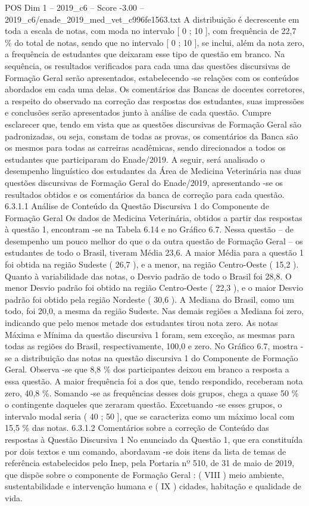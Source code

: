 \begin{textsample}{POS Dim 1 – 2019\_c6 – Score -3.00 – 2019\_c6/enade\_2019\_med\_vet\_c996fe1563.txt}
A distribuição é decrescente em toda a escala de notas, com moda no intervalo [ 0 ; 10 ], com frequência de 22,7 \% do total de notas, sendo que no intervalo [ 0 ; 10 ], se inclui, além da nota zero, a frequência de estudantes que deixaram esse tipo de questão em branco.
Na sequência, os resultados verificados para cada uma das questões discursivas de Formação Geral serão apresentados, estabelecendo -se relações com os conteúdos abordados em cada uma delas.
Os comentários das Bancas de docentes corretores, a respeito do observado na correção das respostas dos estudantes, suas impressões e conclusões serão apresentados junto à análise de cada questão.
Cumpre esclarecer que, tendo em vista que as questões discursivas de Formação Geral são padronizadas, ou seja, constam de todas as provas, os comentários da Banca são os mesmos para todas as carreiras acadêmicas, sendo direcionados a todos os estudantes que participaram do Enade/2019.
A seguir, será analisado o desempenho linguístico dos estudantes da Área de Medicina Veterinária nas duas questões discursivas de Formação Geral do Enade/2019, apresentando -se os resultados obtidos e os comentários da banca de correção para cada questão. 6.3.1.1 Análise de Conteúdo da Questão Discursiva 1 do Componente de Formação Geral Os dados de Medicina Veterinária, obtidos a partir das respostas à questão 1, encontram -se na Tabela 6.14 e no Gráfico 6.7.
Nessa questão – de desempenho um pouco melhor do que o da outra questão de Formação Geral – os estudantes de todo o Brasil, tiveram Média 23,6.
A maior Média para a questão 1 foi obtida na região Sudeste ( 26,7 ), e a menor, na região Centro-Oeste ( 15,2 ).
Quanto à variabilidade das notas, o Desvio padrão de todo o Brasil foi 28,8.
O menor Desvio padrão foi obtido na região Centro-Oeste ( 22,3 ), e o maior Desvio padrão foi obtido pela região Nordeste ( 30,6 ).
A Mediana do Brasil, como um todo, foi 20,0, a mesma da região Sudeste.
Nas demais regiões a Mediana foi zero, indicando que pelo menos metade dos estudantes tirou nota zero.
As notas Máxima e Mínima da questão discursiva 1 foram, sem exceção, as mesmas para todas as regiões do Brasil, respectivamente, 100,0 e zero.
No Gráfico 6.7, mostra -se a distribuição das notas na questão discursiva 1 do Componente de Formação Geral.
Observa -se que 8,8 \% dos participantes deixou em branco a resposta a essa questão.
A maior frequência foi a dos que, tendo respondido, receberam nota zero, 40,8 \%.
Somando -se as frequências desses dois grupos, chega a quase 50 \% o contingente daqueles que zeraram questão.
Excetuando -se esses grupos, o intervalo modal seria ( 40 ; 50 ], que se caracteriza como um máximo local com 15,5 \% das notas. 6.3.1.2 Comentários sobre a correção de Conteúdo das respostas à Questão Discursiva 1 No enunciado da Questão 1, que era constituída por dois textos e um comando, abordavam -se dois itens da lista de temas de referência estabelecidos pelo Inep, pela Portaria nº 510, de 31 de maio de 2019, que dispõe sobre o componente de Formação Geral : ( VIII ) meio ambiente, sustentabilidade e intervenção humana e ( IX ) cidades, habitação e qualidade de vida.

\end{textsample}
